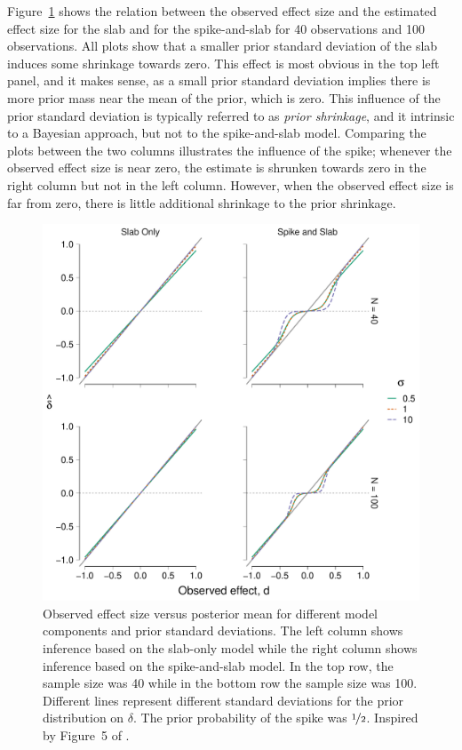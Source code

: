 \documentclass[a4paper]{article}
\newenvironment{revision}{\color{black}}{\color{black}}
\begin{document}
\begin{revision}
Figure~\ref{fig:S_vs_SS_4_panel} shows the relation between the observed effect size and the estimated effect size for the slab and for the spike-and-slab for 40 observations and 100 observations.
All plots show that a smaller prior standard deviation of the slab induces some shrinkage towards zero. This effect is most obvious in the top left panel, and it makes sense, as a small prior standard deviation implies there is more prior mass near the mean of the prior, which is zero.
This influence of the prior standard deviation is typically referred to as \emph{prior shrinkage}, and it intrinsic to a Bayesian approach, but not to the spike-and-slab model.
Comparing the plots between the two columns illustrates the influence of the spike; whenever the observed effect size is near zero, the estimate is shrunken towards zero in the right column but not in the left column.
However, when the observed effect size is far from zero, there is little additional shrinkage to the prior shrinkage.
\begin{figure}[!ht]
	\includegraphics[width=\textwidth]{posteriorMeanVsSampleDelta_4_panel_big_font.pdf}
	\caption{%
		Observed effect size versus posterior mean for different model components and prior standard deviations.
		The left column shows inference based on the slab-only model while the right column shows inference based on the spike-and-slab model.
		In the top row, the sample size was 40 while in the bottom row the sample size was 100.
		Different lines represent different standard deviations for the prior distribution on $\delta$.
		The prior probability of the spike was $\nicefrac{1}{2}$.
		Inspired by Figure~5 of \textcite{RouderEtAl2018PBR}.
	}
	\label{fig:S_vs_SS_4_panel}
\end{figure}


\end{revision}
\end{document}
